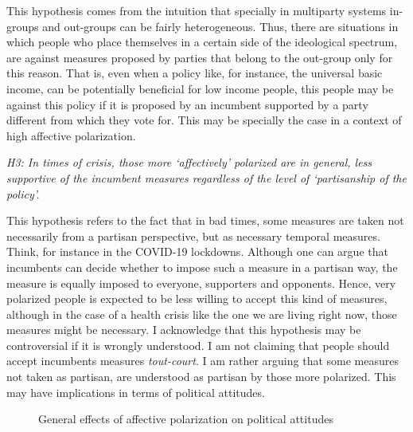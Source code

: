 \documentclass[a4paper, svgnames]{article}
\begin{document}
This hypothesis comes from the intuition that specially in multiparty systems in-groups and out-groups can be fairly heterogeneous. Thus, there are situations in which people who place themselves in a certain side of the ideological spectrum, are against measures proposed by parties that belong to the out-group only for this reason. That is, even when a policy like, for instance, the universal basic income, can be potentially beneficial for low income people, this people may be against this policy if it is proposed by an incumbent supported by a party different from which they vote for. This may be specially the case in a context of high affective polarization.

\textit{H3: In times of crisis, those more `affectively' polarized are in general, less supportive of the incumbent measures regardless of the level of `partisanship of the policy'.}

This hypothesis refers to the fact that in bad times, some measures are taken not necessarily from a partisan perspective, but as necessary temporal measures. Think, for instance in the COVID-19 lockdowns. Although one can argue that incumbents can decide whether to impose such a measure in a partisan way, the measure is equally imposed to everyone, supporters and opponents. Hence, very polarized people is expected to be less willing to accept this kind of measures, although in the case of a health crisis like the one we are living right now, those measures might be necessary. I acknowledge that this hypothesis may be controversial if it is wrongly understood. I am not claiming that people should accept incumbents measures \textit{tout-court}. I am rather arguing that some measures not taken as partisan, are understood as partisan by those more polarized. This may have implications in terms of political attitudes.

\begin{figure}[H]
\centering
{}
\caption{\label{fig:general-model} General effects of affective polarization on political attitudes}
\end{figure}
\end{document}
